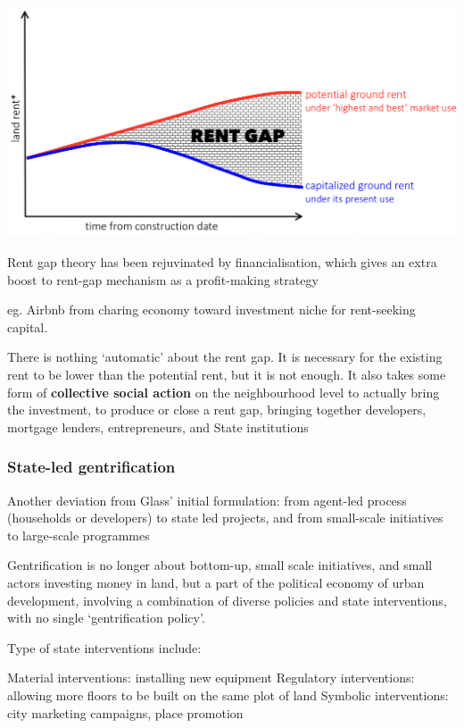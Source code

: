 \documentclass{article}
\begin{document}
\includegraphics[width=\textwidth]{rent_gap_theory}

Rent gap theory has been rejuvinated by financialisation, which gives an extra boost to rent-gap mechanism as a profit-making strategy

eg. Airbnb from charing economy toward investment niche for rent-seeking capital.

There is nothing `automatic' about the rent gap. It is necessary for the existing rent to be lower than the potential rent, but it is not enough. It also takes some form of \textbf{collective social action} on the neighbourhood level to actually bring the investment, to produce or close a rent gap, bringing together developers, mortgage lenders, entrepreneurs, and State institutions

\subsubsection{State-led gentrification}

Another deviation from Glass' initial formulation: from agent-led process (households or developers) to state led projects, and from small-scale initiatives to large-scale programmes

Gentrification is no longer about bottom-up, small scale initiatives, and small actors investing money in land, but a part of the political economy of urban development, involving a combination of diverse policies and state interventions, with no single `gentrification policy'.

Type of state interventions include:

\begin{outline}
	\1 Material interventions: installing new equipment
	\1 Regulatory interventions: allowing more floors to be built on the same plot of land
	\1 Symbolic interventions: city marketing campaigns, place promotion
\end{outline}
\end{document}
